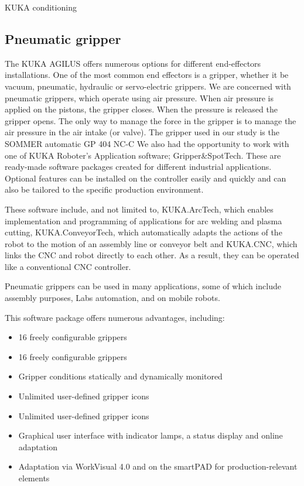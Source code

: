 \documentclass{book}
\begin{document}
\begin{chapter}{KUKA conditioning}
	 	\subsection{Pneumatic gripper}
	 	The KUKA AGILUS offers numerous options for different end-effectors installations. One of the most common end effectors is a gripper, whether it be vacuum, pneumatic, hydraulic or servo-electric grippers. We are concerned with pneumatic grippers, which operate using air pressure. When air pressure is applied on the pistons, the gripper closes. When the pressure is released the gripper opens. The only way to manage the force in the gripper is to manage the air pressure in the air intake (or valve). The gripper used in our study is the SOMMER automatic GP 404 NC-C We also had the opportunity to work with one of KUKA Roboter’s Application software; Gripper\&SpotTech. These are ready-made software packages created for different industrial applications. Optional features can be installed on the controller easily and quickly and can also be tailored to the specific production environment. 
	 	
	 	These software include, and not limited to, KUKA.ArcTech, which enables implementation and programming of applications for arc welding and plasma cutting, KUKA.ConveyorTech, which automatically adapts the actions of the robot to the motion of an assembly line or conveyor belt and KUKA.CNC, which links the CNC and robot directly to each other. As a result, they can be operated like a conventional CNC controller.
	 	
	 	Pneumatic grippers can be used in many applications, some of which include assembly purposes, Labs automation, and on mobile robots.
	 	
	 	This software package offers numerous advantages, including:
	 		\begin{itemize}
	 			\item 16 freely configurable grippers
	 			\item 16 freely configurable grippers
	 			\item Gripper conditions statically and dynamically monitored
	 			\item Unlimited user-defined gripper icons
	 			\item Unlimited user-defined gripper icons
	 			\item Graphical user interface with indicator lamps, a status display and online adaptation
	 			\item Adaptation via WorkVisual 4.0 and on the smartPAD for production-relevant elements
	 		\end{itemize}
 		\newpage	

\end{chapter}
\end{document}
